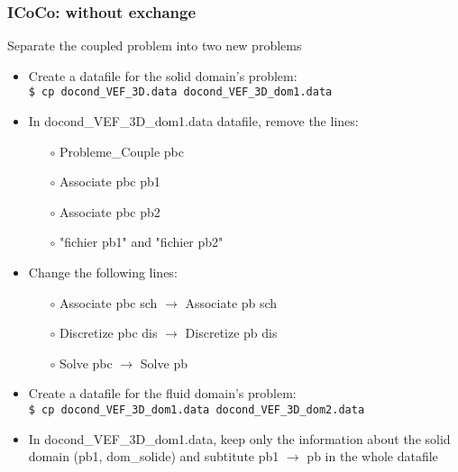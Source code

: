 \documentclass[10pt, hyperref={unicode=true,pdfusetitle, bookmarks=true,bookmarksnumbered=false,bookmarksopen=false, breaklinks=false,pdfborder={0 0 1},backref=true,colorlinks=true,linkcolor=darkblue,pageanchor, urlcolor=darkblue}]{beamer}
\begin{document}
\begin{frame}
\frametitle{ICoCo: without exchange}
\begin{block}{Separate the coupled problem into two new problems}

\begin{itemize}
\item Create a datafile for the solid domain's problem:\\
\texttt{\$ cp docond\_VEF\_3D.data  docond\_VEF\_3D\_dom1.data }
\item In docond\_VEF\_3D\_dom1.data datafile, remove the lines:
    \begin{itemize}
    \item [$\circ$] Probleme\_Couple pbc
    \item [$\circ$] Associate pbc pb1
    \item [$\circ$] Associate pbc pb2
    \item [$\circ$] "fichier pb1" and "fichier pb2"
    \end{itemize}
\item Change the following lines:
    \begin{itemize}
    \item [$\circ$] Associate pbc sch $\rightarrow$ Associate pb sch 
    \item [$\circ$] Discretize pbc dis $\rightarrow$ Discretize pb dis
    \item [$\circ$] Solve pbc $\rightarrow$ Solve pb
    \end{itemize}
\item Create a datafile for the fluid domain's problem:\\
\texttt{\$ cp docond\_VEF\_3D\_dom1.data docond\_VEF\_3D\_dom2.data}
\item In docond\_VEF\_3D\_dom1.data, keep only the information about the solid domain (pb1, dom\_solide) and subtitute pb1 $\rightarrow$ pb in the whole datafile
\end{itemize}

\end{block}
\end{frame}
\end{document}
